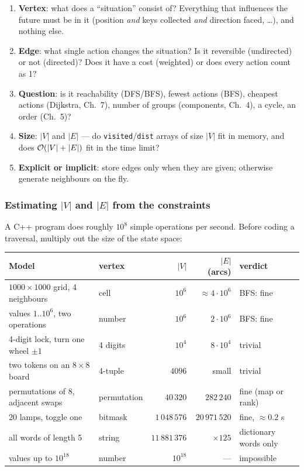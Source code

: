\begin{checklistbox}
\begin{enumerate}[leftmargin=*]
    \item \textbf{Vertex}: what does a ``situation'' consist of? Everything that influences the future must be in it (position \emph{and} keys collected \emph{and} direction faced, \ldots), and nothing else.
    \item \textbf{Edge}: what single action changes the situation? Is it reversible (undirected) or not (directed)? Does it have a cost (weighted) or does every action count as 1?
    \item \textbf{Question}: is it reachability (DFS/BFS), fewest actions (BFS), cheapest actions (Dijkstra, Ch.~7), number of groups (components, Ch.~4), a cycle, an order (Ch.~5)?
    \item \textbf{Size}: $|V|$ and $|E|$ --- do \texttt{visited}/\texttt{dist} arrays of size $|V|$ fit in memory, and does $\mathcal{O}(|V|+|E|)$ fit in the time limit?
    \item \textbf{Explicit or implicit}: store edges only when they are given; otherwise generate neighbours on the fly.
\end{enumerate}
\end{checklistbox}

\subsubsection*{Estimating $|V|$ and $|E|$ from the constraints}

A C++ program does roughly $10^8$ simple operations per second. Before coding a traversal, multiply out the size of the state space:

\begin{table}[H]
\centering\small
\begin{tabularx}{\linewidth}{@{}X l r r l@{}}
\toprule
\textbf{Model} & \textbf{vertex} & $|V|$ & $|E|$ (arcs) & \textbf{verdict} \\
\midrule
$1000\times1000$ grid, 4 neighbours & cell & $10^6$ & $\approx 4\cdot10^6$ & BFS: fine \\
values $1..10^6$, two operations & number & $10^6$ & $2\cdot10^6$ & BFS: fine \\
4-digit lock, turn one wheel $\pm1$ & 4 digits & $10^4$ & $8\cdot10^4$ & trivial \\
two tokens on an $8\times8$ board & 4-tuple & $4096$ & small & trivial \\
permutations of 8, adjacent swaps & permutation & $40\,320$ & $282\,240$ & fine (map or rank) \\
20 lamps, toggle one & bitmask & $1\,048\,576$ & $20\,971\,520$ & fine, $\approx 0.2$ s \\
all words of length 5 & string & $11\,881\,376$ & $\times 125$ & dictionary words only \\
values up to $10^{18}$ & number & $10^{18}$ & --- & impossible \\
\bottomrule
\end{tabularx}
\end{table}

